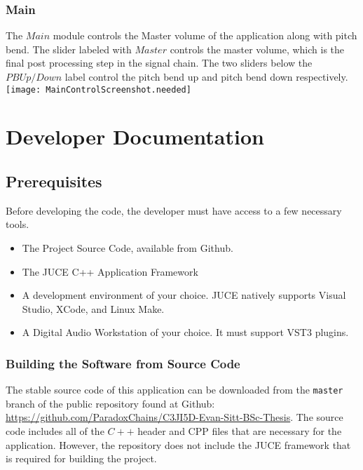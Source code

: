 \documentclass[a4paper,12pt]{report}
\begin{document}
\subsection{Main}
The $Main$ module controls the Master volume of the application along with pitch bend. The slider labeled with $Master$ controls the master volume, which is the final post processing step in the signal chain. The two sliders below the $PB Up/Down$ label control the pitch bend up and pitch bend down respectively.
\texttt{[image: MainControlScreenshot.needed]}


\chapter{Developer Documentation}


\section{Prerequisites}
Before developing the code, the developer must have access to a few necessary tools.
\begin{itemize}
\item The Project Source Code, available from Github.
\item The JUCE C++ Application Framework
\item A development environment of your choice. JUCE natively supports Visual Studio, XCode, and Linux Make.
\item A Digital Audio Workstation of your choice. It must support VST3 plugins.
\end{itemize}
\subsection{Building the Software from Source Code}
The stable source code of this application can be downloaded from the \texttt{master} branch of the public repository found at Github: \href{https://github.com/ParadoxChains/C3JI5D-Evan-Sitt-BSc-Thesis}{https://github.com/ParadoxChains/C3JI5D-Evan-Sitt-BSc-Thesis}. The source code includes all of the $C++$ header and CPP files that are necessary for the application. However, the repository does not include the JUCE framework that is required for building the project.
\end{document}
